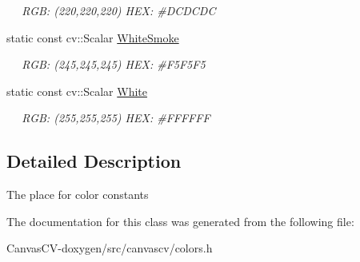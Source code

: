 \begin{DoxyCompactItemize}
\begin{DoxyCompactList}\small\item\em ~~ R\+GB\+: (220,220,220) H\+EX\+: \#\+D\+C\+D\+C\+DC \end{DoxyCompactList}\item 
static const cv\+::\+Scalar \hyperlink{classcanvascv_1_1Colors_a8dec9b80fab8ff9892ef13a29acd7928}{White\+Smoke}\hypertarget{classcanvascv_1_1Colors_a8dec9b80fab8ff9892ef13a29acd7928}{}\label{classcanvascv_1_1Colors_a8dec9b80fab8ff9892ef13a29acd7928}

\begin{DoxyCompactList}\small\item\em ~~ R\+GB\+: (245,245,245) H\+EX\+: \#\+F5\+F5\+F5 \end{DoxyCompactList}\item 
static const cv\+::\+Scalar \hyperlink{classcanvascv_1_1Colors_a79938bbb8f85fc8c8aa34a7934890c08}{White}\hypertarget{classcanvascv_1_1Colors_a79938bbb8f85fc8c8aa34a7934890c08}{}\label{classcanvascv_1_1Colors_a79938bbb8f85fc8c8aa34a7934890c08}

\begin{DoxyCompactList}\small\item\em ~~ R\+GB\+: (255,255,255) H\+EX\+: \#\+F\+F\+F\+F\+FF \end{DoxyCompactList}\end{DoxyCompactItemize}


\subsection{Detailed Description}
The place for color constants 

The documentation for this class was generated from the following file\+:\begin{DoxyCompactItemize}
\item 
Canvas\+C\+V-\/doxygen/src/canvascv/colors.\+h\end{DoxyCompactItemize}
